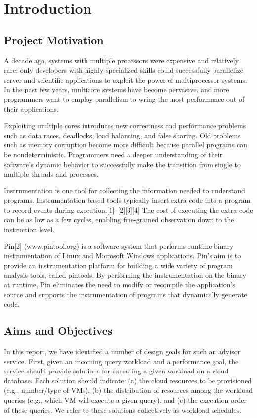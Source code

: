 \chapter{Introduction}
\section{Project Motivation}
A decade ago, systems with multiple processors were expensive and relatively rare; only developers with highly specialized skills could successfully parallelize server and scientific applications to exploit the power of multiprocessor systems. In the past few years, multicore systems have become pervasive, and more programmers want to employ parallelism to wring the most performance out of their applications.

Exploiting multiple cores introduces new correctness and performance problems such as data races, deadlocks, load balancing, and false sharing. Old problems such as memory corruption become more difficult because parallel programs can be nondeterministic. Programmers need a deeper understanding of their software's dynamic behavior to successfully make the transition from single to multiple threads and processes.

Instrumentation is one tool for collecting the information needed to understand programs. Instrumentation-based tools typically insert extra code into a program to record events during execution.[1]–[2][3][4] The cost of executing the extra code can be as low as a few cycles, enabling fine-grained observation down to the instruction level.

Pin[2] (www.pintool.org) is a software system that performs runtime binary instrumentation of Linux and Microsoft Windows applications. Pin's aim is to provide an instrumentation platform for building a wide variety of program analysis tools, called pintools. By performing the instrumentation on the binary at runtime, Pin eliminates the need to modify or recompile the application's source and supports the instrumentation of programs that dynamically generate code. \\
\section{Aims and Objectives}
In this report, we have identified a number of design goals for such an advisor service. First, given an incoming query workload and a performance goal, the service should provide solutions for executing a given workload on a cloud database. Each solution should indicate: (a) the cloud resources to be provisioned (e.g., number/type of VMs), (b) the distribution of resources among the workload queries (e.g., which VM will execute a given query), and (c) the execution order of these queries. We refer to these solutions collectively as workload schedules.

